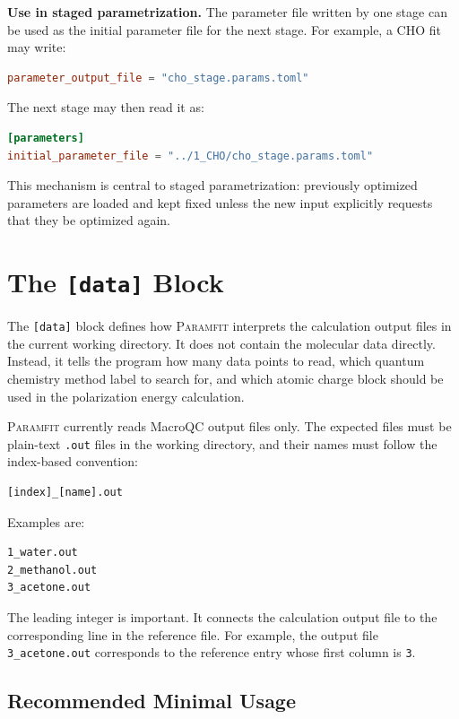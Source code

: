 \documentclass[11pt]{article}
\begin{document}
\textbf{Use in staged parametrization.}
The parameter file written by one stage can be used as the initial parameter
file for the next stage. For example, a CHO fit may write:

\begin{lstlisting}[language=toml]
parameter_output_file = "cho_stage.params.toml"
\end{lstlisting}

The next stage may then read it as:

\begin{lstlisting}[language=toml]
[parameters]
initial_parameter_file = "../1_CHO/cho_stage.params.toml"
\end{lstlisting}

This mechanism is central to staged parametrization: previously optimized
parameters are loaded and kept fixed unless the new input explicitly requests
that they be optimized again.

\section{The \texttt{[data]} Block}

The \texttt{[data]} block defines how \textsc{Paramfit} interprets the
calculation output files in the current working directory. It does not contain
the molecular data directly. Instead, it tells the program how many data points
to read, which quantum chemistry method label to search for, and which atomic
charge block should be used in the polarization energy calculation.

\textsc{Paramfit} currently reads MacroQC output files only. The expected files
must be plain-text \texttt{.out} files in the working directory, and their names
must follow the index-based convention:

\begin{lstlisting}
[index]_[name].out
\end{lstlisting}

Examples are:

\begin{lstlisting}
1_water.out
2_methanol.out
3_acetone.out
\end{lstlisting}

The leading integer is important. It connects the calculation output file to
the corresponding line in the reference file. For example, the output file
\texttt{3\_acetone.out} corresponds to the reference entry whose first column is
\texttt{3}.

\subsection{Recommended Minimal Usage}
\end{document}
